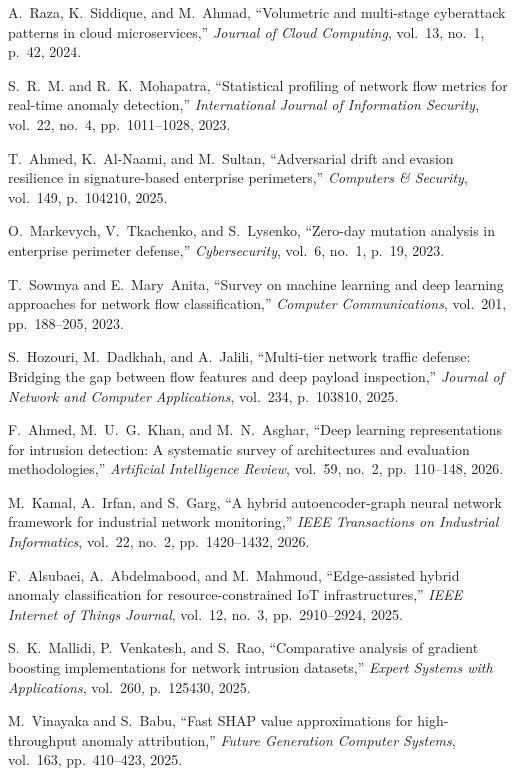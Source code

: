 \documentclass[12pt,a4paper]{report}
\begin{document}
\begin{enumerate}[label={[\arabic*]}, leftmargin=*, itemsep=4pt]
\item A.~Raza, K.~Siddique, and M.~Ahmad, ``Volumetric and multi-stage cyberattack patterns in cloud microservices,'' \emph{Journal of Cloud Computing}, vol.~13, no.~1, p.~42, 2024.
\item S.~R.~M. and R.~K.~Mohapatra, ``Statistical profiling of network flow metrics for real-time anomaly detection,'' \emph{International Journal of Information Security}, vol.~22, no.~4, pp.~1011--1028, 2023.
\item T.~Ahmed, K.~Al-Naami, and M.~Sultan, ``Adversarial drift and evasion resilience in signature-based enterprise perimeters,'' \emph{Computers \& Security}, vol.~149, p.~104210, 2025.
\item O.~Markevych, V.~Tkachenko, and S.~Lysenko, ``Zero-day mutation analysis in enterprise perimeter defense,'' \emph{Cybersecurity}, vol.~6, no.~1, p.~19, 2023.
\item T.~Sowmya and E.~Mary~Anita, ``Survey on machine learning and deep learning approaches for network flow classification,'' \emph{Computer Communications}, vol.~201, pp.~188--205, 2023.
\item S.~Hozouri, M.~Dadkhah, and A.~Jalili, ``Multi-tier network traffic defense: Bridging the gap between flow features and deep payload inspection,'' \emph{Journal of Network and Computer Applications}, vol.~234, p.~103810, 2025.
\item F.~Ahmed, M.~U.~G.~Khan, and M.~N.~Asghar, ``Deep learning representations for intrusion detection: A systematic survey of architectures and evaluation methodologies,'' \emph{Artificial Intelligence Review}, vol.~59, no.~2, pp.~110--148, 2026.
\item M.~Kamal, A.~Irfan, and S.~Garg, ``A hybrid autoencoder-graph neural network framework for industrial network monitoring,'' \emph{IEEE Transactions on Industrial Informatics}, vol.~22, no.~2, pp.~1420--1432, 2026.
\item F.~Alsubaei, A.~Abdelmabood, and M.~Mahmoud, ``Edge-assisted hybrid anomaly classification for resource-constrained IoT infrastructures,'' \emph{IEEE Internet of Things Journal}, vol.~12, no.~3, pp.~2910--2924, 2025.
\item S.~K.~Mallidi, P.~Venkatesh, and S.~Rao, ``Comparative analysis of gradient boosting implementations for network intrusion datasets,'' \emph{Expert Systems with Applications}, vol.~260, p.~125430, 2025.
\item M.~Vinayaka and S.~Babu, ``Fast SHAP value approximations for high-throughput anomaly attribution,'' \emph{Future Generation Computer Systems}, vol.~163, pp.~410--423, 2025.

\end{enumerate}
\end{document}
